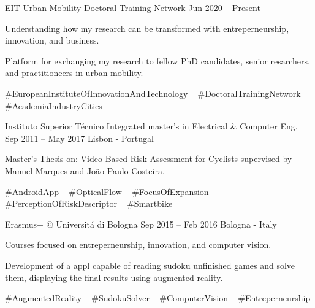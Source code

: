 \begin{cventries}
  \cventryinner
    {EIT Urban Mobility Doctoral Training Network} %
    {Jun 2020 – Present} %
    {} %
    {
      \begin{cvitems} %
        \item {Understanding how my research can be transformed with entreperneurship, innovation, and business.}
        \item {Platform for exchanging my research to fellow PhD candidates, senior resarchers, and practitioneers in urban mobility.}
      \end{cvitems}
    }
    {
      \#EuropeanInstituteOfInnovationAndTechnology ~
      \#DoctoralTrainingNetwork ~
      \#AcademiaIndustryCities ~
    }


  \cventry
    {Instituto Superior Técnico} %
    {Integrated master’s in Electrical \& Computer Eng.} %
    {Sep 2011 – May 2017} %
    {Lisbon - Portugal} %
    {
      \begin{cvitems} %
        \item {Master’s Thesis on: \underline{Video-Based Risk Assessment for Cyclists} supervised by Manuel Marques and João Paulo Costeira.}
      \end{cvitems}
    }
    {
      \#AndroidApp ~
      \#OpticalFlow ~
      \#FocusOfExpansion ~
      \#PerceptionOfRiskDescriptor ~
      \#Smartbike ~
    }

  \cventryinner
    {Erasmus+ @ Universitá di Bologna} %
    {Sep 2015 – Feb 2016} %
    {Bologna - Italy} %
    {
    	\begin{cvitems} %
    		\item {Courses focused on entreperneurship, innovation, and computer vision.}
    		\item {Development of a appl capable of reading sudoku unfinished games and solve them, displaying the final results using augmented reality.}
    	\end{cvitems}
    }
    {
    	\#AugmentedReality ~
    	\#SudokuSolver ~
    	\#ComputerVision ~
    	\#Entreperneurship ~
    }
 
\end{cventries}
